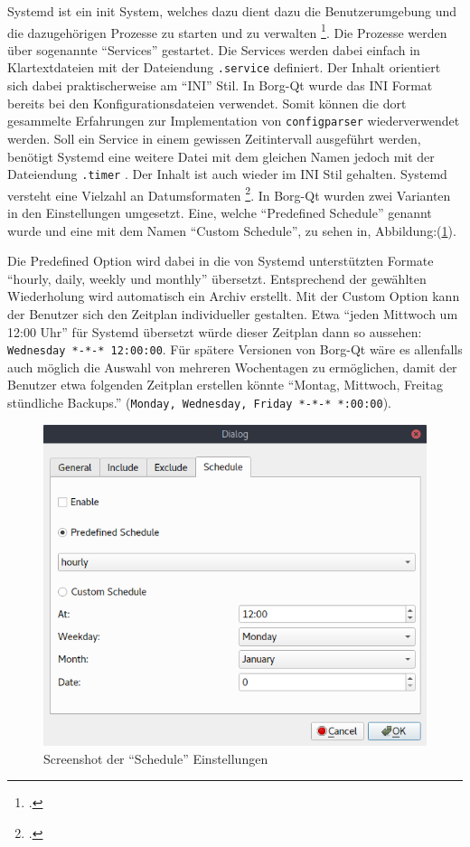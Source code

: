 Systemd ist ein init System, welches dazu dient dazu die Benutzerumgebung und
die dazugehörigen Prozesse zu starten und zu verwalten \footcite{systemd}. Die
Prozesse werden über sogenannte "`Services"' gestartet. Die Services werden dabei
einfach in Klartextdateien mit der Dateiendung \texttt{.service} definiert. Der Inhalt
orientiert sich dabei praktischerweise am "`INI"' Stil. In Borg-Qt wurde das INI
Format bereits bei den Konfigurationsdateien verwendet. Somit können die dort
gesammelte Erfahrungen zur Implementation von \texttt{configparser} wiederverwendet
werden. Soll ein Service in einem gewissen Zeitintervall ausgeführt werden,
benötigt Systemd eine weitere Datei mit dem gleichen Namen jedoch mit der
Dateiendung \texttt{.timer} . Der Inhalt ist auch wieder im INI Stil gehalten. Systemd
versteht eine Vielzahl an Datumsformaten \footcite{systemddate}. In Borg-Qt
wurden zwei Varianten in den Einstellungen umgesetzt. Eine, welche "`Predefined
Schedule"' genannt wurde und eine mit dem Namen "`Custom Schedule"', zu sehen in,
Abbildung:(\ref{fig:orga59a60c}).

\pagebreak
Die Predefined Option wird dabei in die von Systemd unterstützten Formate
"`hourly, daily, weekly und monthly"' übersetzt. Entsprechend der gewählten
Wiederholung wird automatisch ein Archiv erstellt. Mit der Custom Option kann
der Benutzer sich den Zeitplan individueller gestalten. Etwa "`jeden Mittwoch
um 12:00 Uhr"' für Systemd übersetzt würde dieser Zeitplan dann so aussehen:
\texttt{Wednesday *-*-* 12:00:00}. Für spätere Versionen von Borg-Qt wäre es
allenfalls auch möglich die Auswahl von mehreren Wochentagen zu ermöglichen,
damit der Benutzer etwa folgenden Zeitplan erstellen könnte "`Montag, Mittwoch,
Freitag stündliche Backups."' (\texttt{Monday, Wednesday, Friday *-*-*
*:00:00}).

\begin{figure}
\centering
\includegraphics[width=.9\linewidth]{pictures/borgqt_settings_schedule.png}
\caption{\label{fig:orga59a60c}
Screenshot der "`Schedule"' Einstellungen}
\end{figure}

